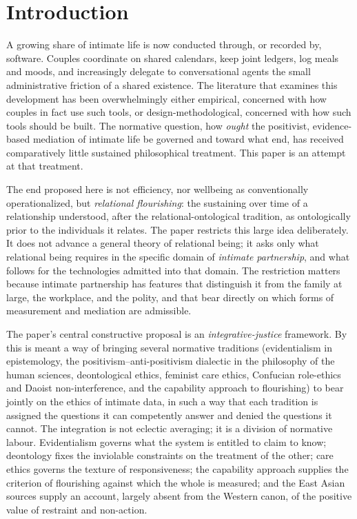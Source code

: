 \documentclass[11pt,a4paper]{article}
\begin{document}
\section{Introduction}\label{p01:sec:intro}

A growing share of intimate life is now conducted through, or recorded by, software. Couples coordinate on shared calendars, keep joint ledgers, log meals and moods, and increasingly delegate to conversational agents the small administrative friction of a shared existence. The literature that examines this development has been overwhelmingly either empirical, concerned with how couples in fact use such tools, or design-methodological, concerned with how such tools should be built. The normative question, how \emph{ought} the positivist, evidence-based mediation of intimate life be governed and toward what end, has received comparatively little sustained philosophical treatment. This paper is an attempt at that treatment.

The end proposed here is not efficiency, nor wellbeing as conventionally operationalized, but \emph{relational flourishing}: the sustaining over time of a relationship understood, after the relational-ontological tradition, as ontologically prior to the individuals it relates. The paper restricts this large idea deliberately. It does not advance a general theory of relational being; it asks only what relational being requires in the specific domain of \emph{intimate partnership}, and what follows for the technologies admitted into that domain. The restriction matters because intimate partnership has features that distinguish it from the family at large, the workplace, and the polity, and that bear directly on which forms of measurement and mediation are admissible.

The paper's central constructive proposal is an \emph{integrative-justice} framework. By this is meant a way of bringing several normative traditions (evidentialism in epistemology, the positivism--anti-positivism dialectic in the philosophy of the human sciences, deontological ethics, feminist care ethics, Confucian role-ethics and Daoist non-interference, and the capability approach to flourishing) to bear jointly on the ethics of intimate data, in such a way that each tradition is assigned the questions it can competently answer and denied the questions it cannot. The integration is not eclectic averaging; it is a division of normative labour. Evidentialism governs what the system is entitled to claim to know; deontology fixes the inviolable constraints on the treatment of the other; care ethics governs the texture of responsiveness; the capability approach supplies the criterion of flourishing against which the whole is measured; and the East Asian sources supply an account, largely absent from the Western canon, of the positive value of restraint and non-action.
\end{document}

